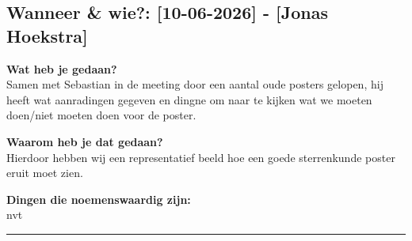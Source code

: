 
\subsection*{Wanneer \& wie?: [10-06-2026] - [Jonas Hoekstra]}

\textbf{Wat heb je gedaan?}\\
Samen met Sebastian in de meeting door een aantal oude posters gelopen, hij heeft wat aanradingen gegeven en dingne om naar te kijken wat we moeten doen/niet moeten doen voor de poster.
\vspace{0.3cm} 

\noindent \textbf{Waarom heb je dat gedaan?}\\
Hierdoor hebben wij een representatief beeld hoe een goede sterrenkunde poster eruit moet zien.

\noindent \textbf{Dingen die noemenswaardig zijn:}\\
nvt


\vspace{0.5cm}
\hrule 
\vspace{0.5cm}
